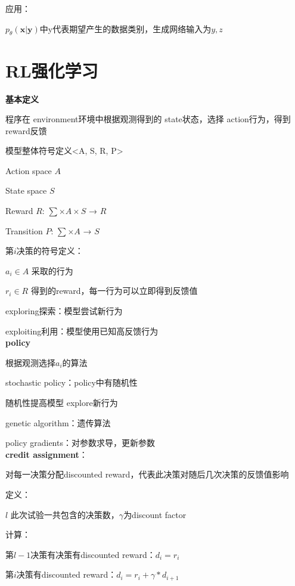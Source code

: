 \documentclass[UTF8]{ctexart}
\begin{document}
  应用：

  \quad $p_{\theta}(\mathbf{x} | \mathbf{y})$中y代表期望产生的数据类别，生成网络输入为$y, z$



\section{RL强化学习}
\noindent \textbf{基本定义}

  程序在 environment环境中根据观测得到的 state状态，选择 action行为，得到reward反馈

  模型整体符号定义<A, S, R, P>

  \quad Action space $A$
  
  \quad State space $S$
  
  \quad Reward $R$: $\sum \times A \times S$ → $R$
  
  \quad Transition $P$: $\sum \times A$ → $S$

  第$i$决策的符号定义：

  \quad $a_i \in A$ 采取的行为

  \quad $r_i \in R$ 得到的reward，每一行为可以立即得到反馈值
  
  exploring探索：模型尝试新行为
  
  exploiting利用：模型使用已知高反馈行为\\
\textbf{policy}

  根据观测选择$a_i$的算法

  stochastic policy：policy中有随机性

  \quad 随机性提高模型 explore新行为

  genetic algorithm：遗传算法

  policy gradients：对参数求导，更新参数\\
\textbf{credit assignment}：

  对每一决策分配discounted reward，代表此决策对随后几次决策的反馈值影响

  定义：

  \quad $l$ 此次试验一共包含的决策数，$\gamma$为discount factor

  计算：

  \quad 第$l-1$决策有决策有discounted reward：$d_i = r_i$
  
  \quad 第$i$决策有discounted reward：$d_i = r_i + \gamma * d_{i+1}$
  
\end{document}
